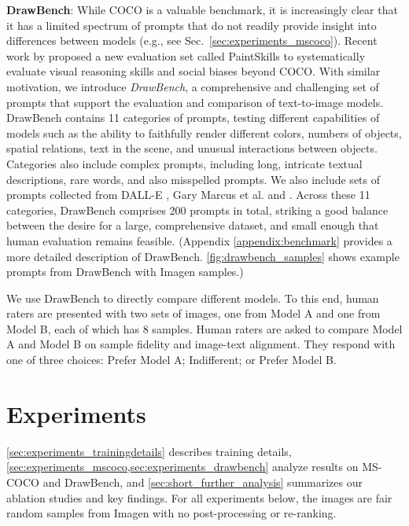 \textbf{DrawBench}:
While COCO is a valuable benchmark, it is increasingly clear that it has a limited spectrum of prompts that do not readily provide insight into differences between models (e.g., see Sec.\  \ref{sec:experiments_mscoco}). 
Recent work by \citep{dalleval} proposed a new evaluation set called PaintSkills to systematically evaluate visual reasoning skills and social biases beyond COCO. With similar motivation, we introduce \emph{DrawBench}, a comprehensive and challenging set of prompts that support the evaluation and comparison of text-to-image models. DrawBench contains 11 categories of prompts, testing different capabilities of models such as the ability to faithfully render different colors, numbers of objects, spatial relations, text in the scene, and unusual interactions between objects. Categories also include complex prompts, including long, intricate textual descriptions, rare words, and also misspelled prompts. We also include sets of prompts collected from DALL-E \cite{ramesh-dalle}, Gary Marcus et al. \cite{marcus-arxiv-2022} and \href{https://reddit.com/r/dalle2/}{\color{black}{Reddit}}.
Across these 11 categories,  DrawBench comprises 200 prompts in total, striking a good balance between the desire for a large, comprehensive dataset, and small enough that human evaluation remains feasible. (Appendix \ref{appendix:benchmark} provides a more detailed description of DrawBench. \ref{fig:drawbench_samples} shows example prompts from DrawBench with Imagen samples.)

We use DrawBench to directly compare different models. To this end, human raters are presented with two sets of images, one from Model A and one from Model B, each of which has 8 samples. Human raters are asked to compare Model A and Model B on sample fidelity and image-text alignment. They respond with one of three choices: Prefer Model A; Indifferent; or Prefer Model B. 

\section{Experiments}

\label{sec:experiments}
\ref{sec:experiments_trainingdetails} describes training details, \ref{sec:experiments_mscoco,sec:experiments_drawbench} analyze results on MS-COCO and  DrawBench, and \ref{sec:short_further_analysis} summarizes our ablation studies and key findings. For all experiments below, the images are fair random samples from Imagen with no post-processing or re-ranking.

